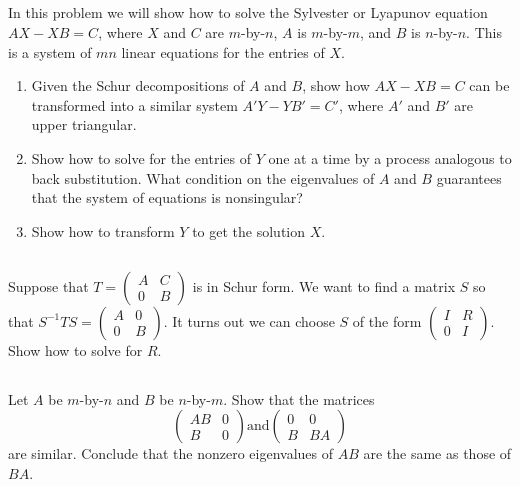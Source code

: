\documentclass[a4paper]{ctexart}
\newcommand{\pf}{\textbf{\color{pink}{proof:}}}
\begin{document}
\pf

\subsection{}
In this problem we will show how to solve the
Sylvester or Lyapunov equation $AX - XB = C$, where $X$ and $C$ are $m$-by-$n$,
$A$ is $m$-by-$m$, and $B$ is $n$-by-$n$. This is a system of $mn$ linear equations for the
entries of $X$.
\begin{enumerate}
    \item Given the Schur decompositions of $A$ and $B$, show how $AX - XB = C$
    can be transformed into a similar system $A'Y - Y B' = C'$, where $A'$ and
    $B'$ are upper triangular.
    \item Show how to solve for the entries of $Y$ one at a time by a process analogous
     to back substitution. What condition on the eigenvalues of $A$ and
    $B$ guarantees that the system of equations is nonsingular?
    \item Show how to transform $Y$ to get the solution $X$.
\end{enumerate}

\pf

\subsection{}
Suppose that $T = \begin{pmatrix}A&C\\0&B\end{pmatrix}$  is in Schur form.
We want to find a matrix $S$ so that $S^{-1}T S =  \begin{pmatrix}A&0\\0&B\end{pmatrix}$. It turns out we can choose
$S$ of the form $\begin{pmatrix}I&R\\0&I\end{pmatrix}$. Show how to solve for $R$.

\pf

\subsection{}
Let $A$ be $m$-by-$n$ and $B$ be $n$-by-$m$. Show
that the matrices
\begin{equation*}
    \begin{pmatrix}
        AB&0\\B&0
    \end{pmatrix}
    \text{and}
    \begin{pmatrix}
        0&0\\B&BA
    \end{pmatrix}
\end{equation*}
are similar. Conclude that the nonzero eigenvalues of $AB$ are the same as
those of $BA$.
\end{document}
